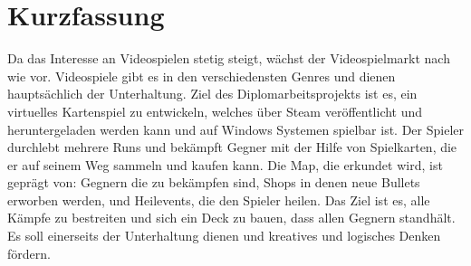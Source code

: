 \chapter{Kurzfassung}

Da das Interesse an Videospielen stetig steigt, wächst der Videospielmarkt nach wie vor.
Videospiele gibt es in den verschiedensten Genres und dienen hauptsächlich der Unterhaltung.
Ziel des Diplomarbeitsprojekts ist es, ein virtuelles Kartenspiel zu entwickeln, welches über Steam veröffentlicht und heruntergeladen werden kann und auf Windows Systemen spielbar ist. Der Spieler durchlebt mehrere Runs und bekämpft Gegner mit der Hilfe von Spielkarten, die er auf seinem Weg sammeln und kaufen kann. Die Map, die erkundet wird, ist geprägt von: Gegnern die zu bekämpfen sind, Shops in denen neue Bullets erworben werden, und Heilevents, die den Spieler heilen. Das Ziel ist es, alle Kämpfe zu bestreiten und sich ein Deck zu bauen, dass allen Gegnern standhält.
Es soll einerseits der Unterhaltung dienen und kreatives und logisches Denken fördern.
